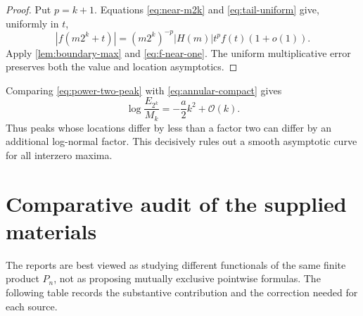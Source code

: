 \documentclass[11pt,oneside]{article}
\theoremstyle{definition}
\theoremstyle{remark}
\newcommand{\bigO}{\mathcal O}
\begin{document}
\begin{proof}
Put $p=k+1$.  Equations \eqref{eq:near-m2k} and \eqref{eq:tail-uniform} give,
uniformly in $t$,
\[
 |f(m2^k+t)|
 =(m2^k)^{-p}|H(m)|t^pf(t)(1+o(1)).
\]
Apply \cref{lem:boundary-max} and \eqref{eq:f-near-one}.  The uniform
multiplicative error preserves both the value and location asymptotics.
\end{proof}

Comparing \eqref{eq:power-two-peak} with \eqref{eq:annular-compact} gives
\begin{equation}
 \log\frac{E_{2^k}}{M_k}=-\frac a2k^2+\bigO(k).
 \label{eq:peak-spread}
\end{equation}
Thus peaks whose locations differ by less than a factor two can differ by an
additional log-normal factor.  This decisively rules out a smooth asymptotic
curve for all interzero maxima.

\section{Comparative audit of the supplied materials}
\label{sec:audit}

The reports are best viewed as studying different functionals of the same
finite product $P_n$, not as proposing mutually exclusive pointwise formulas.
The following table records the substantive contribution and the correction
needed for each source.
\end{document}
